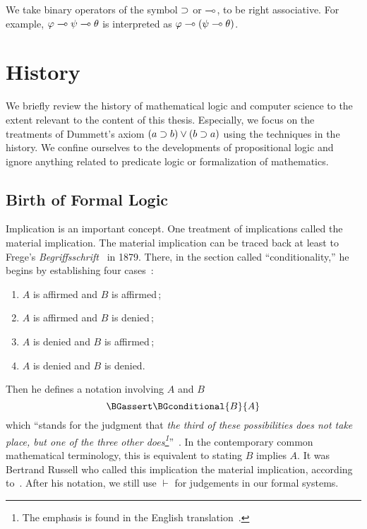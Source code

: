  We take binary operators of the symbol $\supset$ or $\multimap$,
 to be right associative.  For example, $\varphi\multimap\psi\multimap\theta$
 is interpreted as $\varphi\multimap(\psi\multimap\theta)$.

\section{History}

We briefly review the history of mathematical logic and computer science
to the extent relevant to the content of this thesis.
Especially, we focus on the treatments of Dummett's axiom $(a\supset
b)\lor(b\supset a)$ using the techniques in the history.
We confine ourselves to the developments of propositional logic and
ignore anything related to predicate logic or formalization of
mathematics.

\subsection{Birth of Formal Logic}

Implication is an important concept.
One treatment of implications called the material
implication.
The material implication can be traced back at least to
Frege's \textit{Begriffsschrift}~\citep{frege} in 1879.
There, in the
section called ``conditionality,''
he begins by establishing four cases~\citep[p.~13]{frege}:
\begin{enumerate}
 \item $A$ is affirmed and $B$ is affirmed\,;
 \item $A$ is affirmed and $B$ is denied\,;
 \item $A$ is denied and $B$ is affirmed\,;
 \item $A$ is denied and $B$ is denied.
\end{enumerate}
Then he defines a notation involving $A$ and $B$
\[
\BGassert\BGconditional{B}{A}
\]
which ``stands for the
judgment that \textit{the third of these possibilities does not take
place, but one of the three other does\footnote{The emphasis is found in
the English translation~\citep[p.~14]{frege}.}}''~\citep[p.~14]{frege}.
In the contemporary common mathematical terminology, this is equivalent
to stating $B$ implies $A$.
It was Bertrand Russell who called this implication the material
implication,
according to~\citet{sep-conditionals}.
After his notation, we still use $\vdash$ for judgements in our formal systems.


